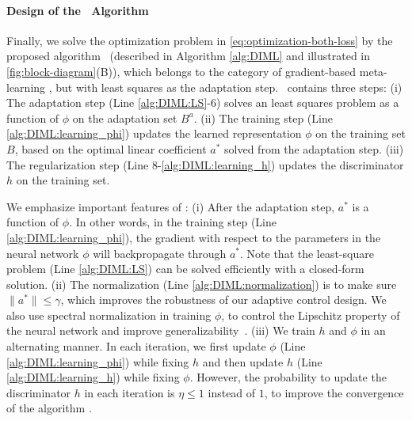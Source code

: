 \paragraph{Design of the \DAML~Algorithm} Finally, we solve the optimization problem in \cref{eq:optimization-both-loss} by the proposed algorithm \DAML~(described in Algorithm \ref{alg:DIML} and illustrated in \cref{fig:block-diagram}(B)), which belongs to the category of gradient-based meta-learning \cite{meta-learning-survey}, but with least squares as the adaptation step. \DAML~contains three steps: (i) The adaptation step (Line \ref{alg:DIML:LS}-6) solves an least squares problem as a function of $\phi$ on the adaptation set $B^a$. (ii) The training step (Line \ref{alg:DIML:learning_phi}) updates the learned representation $\phi$ on the training set $B$, based on the optimal linear coefficient $a^*$ solved from the adaptation step. (iii) The regularization step (Line 8-\ref{alg:DIML:learning_h}) updates the discriminator $h$ on the training set.

We emphasize important features of \DAML:
(i) After the adaptation step, $a^*$ is a function of $\phi$. In other words, in the training step (Line \ref{alg:DIML:learning_phi}), the gradient with respect to the parameters in the neural network $\phi$ will backpropagate through $a^*$. Note that the least-square problem (Line \ref{alg:DIML:LS}) can be solved efficiently with a closed-form solution.
(ii) The normalization (Line \ref{alg:DIML:normalization}) is to make sure $\|a^*\|\leq\gamma$, which improves the robustness of our adaptive control design. We also use spectral normalization in training $\phi$, to control the Lipschitz property of the neural network and improve generalizability~\cite{shi2019neural,shi2021neural,bartlett2017spectrally}. 
(iii) We train $h$ and $\phi$ in an alternating manner. In each iteration, we first update $\phi$ (Line \ref{alg:DIML:learning_phi}) while fixing $h$ and then update $h$ (Line \ref{alg:DIML:learning_h}) while fixing $\phi$. However, the probability to update the discriminator $h$ in each iteration is $\eta\leq1$ instead of $1$, to improve the convergence of the algorithm \cite{goodfellow2014generative}. 


